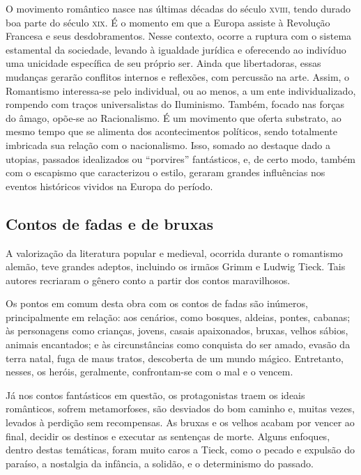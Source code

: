 \documentclass[12pt]{extarticle}
\begin{document}
O movimento romântico nasce nas últimas décadas do século \textsc{xviii}, tendo
durado boa parte do século \textsc{xix}. É o momento em que a Europa assiste à
Revolução Francesa e seus desdobramentos. Nesse contexto, ocorre a
ruptura com o sistema estamental da sociedade, levando à igualdade
jurídica e oferecendo ao indivíduo uma unicidade específica de seu
próprio ser. Ainda que libertadoras, essas mudanças gerarão conflitos
internos e reflexões, com percussão na arte. Assim, o Romantismo
interessa-se pelo individual, ou ao menos, a um ente individualizado,
rompendo com traços universalistas do Iluminismo. Também, focado nas
forças do âmago, opõe-se ao Racionalismo. É um movimento que oferta
substrato, ao mesmo tempo que se alimenta dos acontecimentos políticos,
sendo totalmente imbricada sua relação com o nacionalismo. Isso, somado
ao destaque dado a utopias, passados idealizados ou ``porvires''
fantásticos, e, de certo modo, também com o escapismo que caracterizou o
estilo, geraram grandes influências nos eventos históricos vividos na
Europa do período.

\subsection{Contos de fadas e de bruxas}

A valorização da literatura popular e medieval, ocorrida durante o
romantismo alemão, teve grandes adeptos, incluindo os irmãos Grimm e
Ludwig Tieck. Tais autores recriaram o gênero conto a partir dos contos
maravilhosos.

Os pontos em comum desta obra com os contos de fadas são inúmeros,
principalmente em relação: aos cenários, como bosques, aldeias, pontes,
cabanas; às personagens como crianças, jovens, casais apaixonados,
bruxas, velhos sábios, animais encantados; e às circunstâncias como
conquista do ser amado, evasão da terra natal, fuga de maus tratos,
descoberta de um mundo mágico. Entretanto, nesses, os heróis,
geralmente, confrontam-se com o mal e o vencem.

Já nos contos fantásticos em questão, os protagonistas traem os ideais
românticos, sofrem metamorfoses, são desviados do bom caminho e, muitas
vezes, levados à perdição sem recompensas. As bruxas e os velhos acabam
por vencer ao final, decidir os destinos e executar as sentenças de
morte. Alguns enfoques, dentro destas temáticas, foram muito caros a
Tieck, como o pecado e expulsão do paraíso, a nostalgia da infância, a
solidão, e o determinismo do passado.
\end{document}
